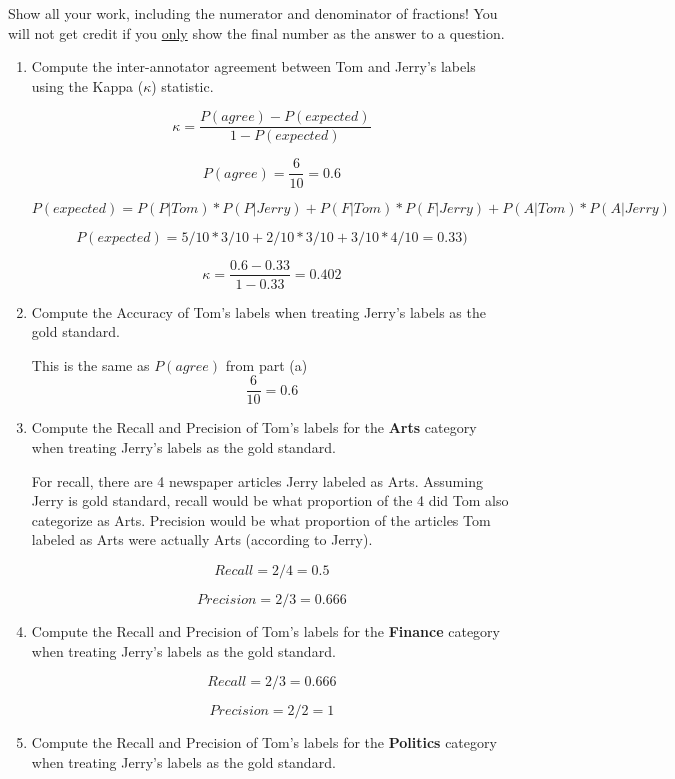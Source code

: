 \documentclass[11pt]{article}
\begin{document}
\begin{enumerate}
\vspace*{.1in}
Show all your work, including the numerator and denominator of
fractions! You will not get credit if you \underline{only} show the final number
as the answer to a question.

\begin{enumerate}
\item Compute the inter-annotator agreement between Tom and Jerry's
  labels using the Kappa ($\kappa$) statistic. 
  
  $$\kappa = \frac{P(agree) - P(expected)}{1 - P(expected)} $$
  
  $$P(agree) = \frac{6}{10} = 0.6$$
  
  $$P(expected) = P(P|Tom) * P(P|Jerry) + P(F|Tom) * P(F|Jerry) + P(A|Tom) * P(A|Jerry)$$
  
  $$P(expected) = 5/10 * 3/10 + 2/10 * 3/10 + 3/10 * 4/10 = 0.33)$$
  
  $$\kappa = \frac{0.6-0.33}{1-0.33} = 0.402$$

\item Compute the Accuracy of Tom's labels when treating Jerry's
  labels as the gold standard. 
  
  This is the same as $P(agree)$ from part (a)  
  $$\frac{6}{10} = 0.6$$
  

\item Compute the Recall and Precision of Tom's labels for the {\bf Arts} category when
 treating Jerry's labels as the gold standard. 
 
 For recall, there are 4 newspaper articles Jerry labeled as Arts. Assuming Jerry is gold standard, recall would be what proportion of the 4 did Tom also categorize as Arts. Precision would be what proportion of the articles Tom labeled as Arts were actually Arts (according to Jerry).
 
 $$Recall = 2/4 = 0.5$$
 
 $$Precision = 2 / 3 = 0.666$$

\item Compute the Recall and Precision of Tom's labels for the {\bf Finance} category when
 treating Jerry's labels as the gold standard. 
 
 $$Recall = 2/3 = 0.666$$
 
 $$Precision = 2/2 = 1$$

\item Compute the Recall and Precision of Tom's labels for the {\bf Politics} category
  when treating Jerry's labels as the gold standard.  
  

\end{enumerate}
\end{enumerate}
\end{document}
